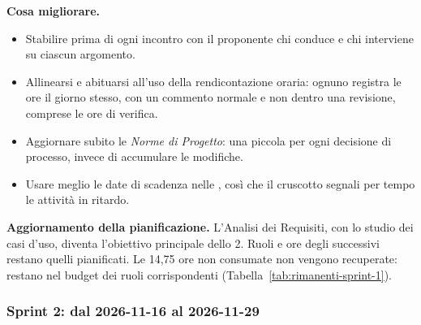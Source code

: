 \documentclass[documento]{gpt}
\begin{document}
\textbf{Cosa migliorare.}
\begin{itemize}
  \item Stabilire prima di ogni incontro con il proponente chi conduce e
        chi interviene su ciascun argomento.
  \item Allinearsi e abituarsi all'uso della rendicontazione oraria:
        ognuno registra le ore il giorno stesso, con un commento normale e
        non dentro una revisione, comprese le ore di verifica.
  \item Aggiornare subito le \textit{Norme di Progetto}: una piccola
         per ogni decisione di
        processo, invece di accumulare le modifiche.
  \item Usare meglio le date di scadenza nelle ,
        così che il cruscotto segnali per tempo le attività in ritardo.
\end{itemize}

\textbf{Aggiornamento della pianificazione.} L'Analisi dei Requisiti, con
lo studio dei casi d'uso, diventa l'obiettivo principale dello
 2. Ruoli e ore degli 
successivi restano quelli pianificati. Le 14,75 ore non consumate non
vengono recuperate: restano nel budget dei ruoli corrispondenti
(Tabella~\ref{tab:rimanenti-sprint-1}).

\subsubsection{Sprint 2: dal 2026-11-16 al 2026-11-29}\label{sec:sprint-2}
\end{document}
